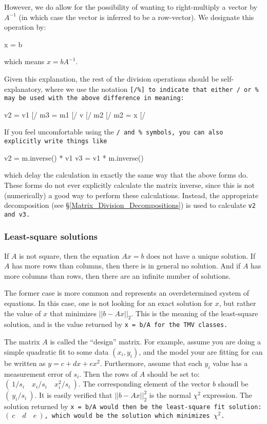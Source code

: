 However, we do allow for the possibility of wanting to right-multiply a vector
by $A^{-1}$ (in which case the vector is inferred to be a row-vector).  We designate
this operation by:
\begin{tmvcode}
x = b %
\end{tmvcode}
which means $x = b A^{-1}$.

Given this explanation, the rest of the division operations should be self-explanatory,
where we use the notation \tt{[/\%]} to indicate that either \tt{/} or \tt{\%} may
be used with the above difference in meaning:
\begin{tmvcode}
v2 = v1 [/%
m3 = m1 [/%
v [/%
m2 [/%
m2 = x [/%
\end{tmvcode}

If you feel uncomfortable using the \tt{/} and \tt{\%} symbols,
you can also explicitly write things like
\begin{tmvcode}
v2 = m.inverse() * v1
v3 = v1 * m.inverse()
\end{tmvcode}
which delay the calculation in exactly the same way that the above forms do.  
These forms
do not ever explicitly calculate the matrix inverse, since this is not (numerically) a
good way to perform these calculations.  Instead, the appropriate decomposition 
(see \S\ref{Matrix_Division_Decompositions})
is used to calculate \tt{v2} and \tt{v3}.

\subsubsection{Least-square solutions}
\label{Matrix_Division_Leastsquare}

If $A$ is not square, then the equation $A x = b$ does not have a unique solution.
If $A$ has more rows than columns, then there is in general no solution.
And if $A$ has more columns than rows, then there are an infinite 
number of solutions.  

The former case is more common and represents an overdetermined system of 
equations.  In this case, one is not looking for an exact solution
for $x$, but rather the value of $x$ that minimizes $||b - A x||_2$.  This is the 
meaning of the least-square
solution, and is the value returned by \tt{x = b/A} for the TMV classes.  

The matrix $A$ is called the ``design'' matrix.  For example, assume you are doing
a simple quadratic fit to some data $(x_i,y_i)$, and the model your are fitting for
can be written as
$y = c + dx + ex^2$.  Furthermore, assume that each
$y_i$ value has a measurement error of $s_i$.  Then the rows of $A$ should
be set to: $( ~1/s_i \quad x_i/s_i \quad x_i^2/s_i ~ )$.  The corresponding
element of the vector $b$ shoudl be $( ~ y_i/s_i ~ )$.  It is easily verified that
$||b-Ax||_2^2$ is the normal $\chi^2$ expression.
The solution returned by
\tt{x = b/A} would then be the least-square fit solution: $(~c \quad d \quad e~)$,
which would be the solution which minimizes $\chi^2$.

